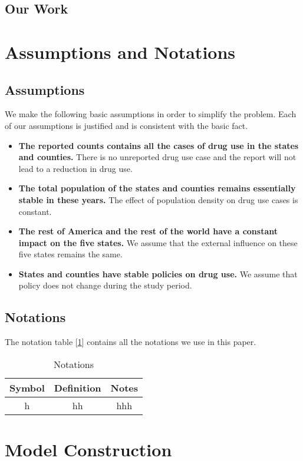 \documentclass{mcmthesis}
\begin{document}
\subsection{Our Work}


\section{Assumptions and Notations}

\subsection{Assumptions}
We make the following basic assumptions in order to simplify the problem. Each
of our assumptions is justified and is consistent with the basic fact.
\begin{itemize}
	\item \textbf{The reported counts contains all the cases of drug use in the states and counties.} There is no unreported drug use case and the report will not lead to a reduction in drug use.
	\item \textbf{The total population of the states and counties remains essentially stable in these years.} The effect of population density on drug use cases is constant.
	\item \textbf{The rest of America and the rest of the world have a constant impact on the five states.} We assume that the external influence on these five states remains the same.
	\item \textbf{States and counties have stable policies on drug use.} We assume that policy does not change during the study period.
\end{itemize}

\subsection{Notations}
The notation table [\ref{table-notations}] contains all the notations we use in this paper.
\begin{table}[h]
	\centering
	\caption{Notations} \label{table-notations}
	\begin{tabular}{ccc}
		\toprule
		Symbol & Definition & Notes\\
		\midrule
		h & hh & hhh\\
		\bottomrule
	\end{tabular}
\end{table}

\section{Model Construction}
\end{document}
